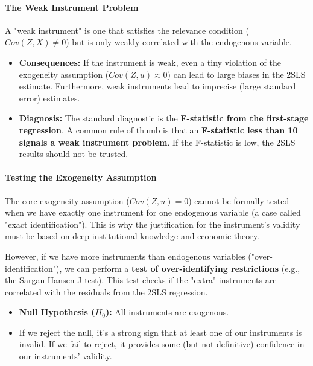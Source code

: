 \documentclass{article}
\providecommand{\tightlist}{
  \setlength{\itemsep}{0pt}
  \setlength{\parskip}{0pt}}
\begin{document}
\paragraph{The Weak Instrument Problem}
A "weak instrument" is one that satisfies the relevance condition ($Cov(Z, X) \neq 0$) but is only weakly correlated with the endogenous variable.
\begin{itemize}
    \tightlist
    \item \textbf{Consequences:} If the instrument is weak, even a tiny violation of the exogeneity assumption ($Cov(Z, u) \approx 0$) can lead to large biases in the 2SLS estimate. Furthermore, weak instruments lead to imprecise (large standard error) estimates.
    \item \textbf{Diagnosis:} The standard diagnostic is the \textbf{F-statistic from the first-stage regression}. A common rule of thumb is that an \textbf{F-statistic less than 10 signals a weak instrument problem}. If the F-statistic is low, the 2SLS results should not be trusted.
\end{itemize}

\paragraph{Testing the Exogeneity Assumption}
The core exogeneity assumption ($Cov(Z, u) = 0$) cannot be formally tested when we have exactly one instrument for one endogenous variable (a case called "exact identification"). This is why the justification for the instrument's validity must be based on deep institutional knowledge and economic theory.

However, if we have more instruments than endogenous variables ("over-identification"), we can perform a \textbf{test of over-identifying restrictions} (e.g., the Sargan-Hansen J-test). This test checks if the "extra" instruments are correlated with the residuals from the 2SLS regression.
\begin{itemize}
    \tightlist
    \item \textbf{Null Hypothesis ($H_0$):} All instruments are exogenous.
    \item If we reject the null, it's a strong sign that at least one of our instruments is invalid. If we fail to reject, it provides some (but not definitive) confidence in our instruments' validity.
\end{itemize}
\end{document}
